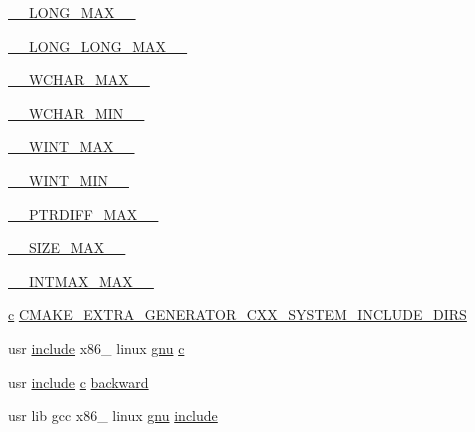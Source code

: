 \begin{DoxyCompactItemize}
\item 
\hyperlink{CMakeCache_8txt_a9efbe01f7e7b66cbdac106fb51e2f65f}{\+\_\+\+\_\+\+L\+O\+N\+G\+\_\+\+M\+A\+X\+\_\+\+\_\+}
\item 
\hyperlink{CMakeCache_8txt_ade7a297151900f13d47b71e6a9dda0a1}{\+\_\+\+\_\+\+L\+O\+N\+G\+\_\+\+L\+O\+N\+G\+\_\+\+M\+A\+X\+\_\+\+\_\+}
\item 
\hyperlink{CMakeCache_8txt_ab06c84ef26aaf126084f60730505b6b4}{\+\_\+\+\_\+\+W\+C\+H\+A\+R\+\_\+\+M\+A\+X\+\_\+\+\_\+}
\item 
\hyperlink{CMakeCache_8txt_ab2394184364567c4286a32eec574295e}{\+\_\+\+\_\+\+W\+C\+H\+A\+R\+\_\+\+M\+I\+N\+\_\+\+\_\+}
\item 
\hyperlink{CMakeCache_8txt_ade9fb9056c1b3e7f9417478f12ac5452}{\+\_\+\+\_\+\+W\+I\+N\+T\+\_\+\+M\+A\+X\+\_\+\+\_\+}
\item 
\hyperlink{CMakeCache_8txt_a0101eb15159977cbfe763d0d71a7023f}{\+\_\+\+\_\+\+W\+I\+N\+T\+\_\+\+M\+I\+N\+\_\+\+\_\+}
\item 
\hyperlink{CMakeCache_8txt_a047880d1824d5ce75ac17952c273fcc5}{\+\_\+\+\_\+\+P\+T\+R\+D\+I\+F\+F\+\_\+\+M\+A\+X\+\_\+\+\_\+}
\item 
\hyperlink{CMakeCache_8txt_ad4abf877d7a79e3d1d13494ce6d64d73}{\+\_\+\+\_\+\+S\+I\+Z\+E\+\_\+\+M\+A\+X\+\_\+\+\_\+}
\item 
\hyperlink{CMakeCache_8txt_a6b068320140ebfbbeaa001c18465ea9e}{\+\_\+\+\_\+\+I\+N\+T\+M\+A\+X\+\_\+\+M\+A\+X\+\_\+\+\_\+}
\item 
\hyperlink{CMakeCache_8txt_aac1d6a1710812201527c735f7c6afbaa}{c} \hyperlink{CMakeCache_8txt_ae84758144b16fbed96a3e6ea5781d3ad}{C\+M\+A\+K\+E\+\_\+\+E\+X\+T\+R\+A\+\_\+\+G\+E\+N\+E\+R\+A\+T\+O\+R\+\_\+\+C\+X\+X\+\_\+\+S\+Y\+S\+T\+E\+M\+\_\+\+I\+N\+C\+L\+U\+D\+E\+\_\+\+D\+I\+RS}
\item 
usr \hyperlink{CMakeCache_8txt_a986ccfc90e04633694fe6cff5472be19}{include} x86\+\_ linux \hyperlink{CMakeCache_8txt_acb61b5fec09bcc7d3b88bf1109612ea6}{gnu} \hyperlink{CMakeCache_8txt_aac1d6a1710812201527c735f7c6afbaa}{c}
\item 
usr \hyperlink{CMakeCache_8txt_a986ccfc90e04633694fe6cff5472be19}{include} \hyperlink{CMakeCache_8txt_aac1d6a1710812201527c735f7c6afbaa}{c} \hyperlink{CMakeCache_8txt_a4e00b9c657cdeb7b14ea0c43097dcecc}{backward}
\item 
usr lib gcc x86\+\_ linux \hyperlink{CMakeCache_8txt_acb61b5fec09bcc7d3b88bf1109612ea6}{gnu} \hyperlink{CMakeCache_8txt_a986ccfc90e04633694fe6cff5472be19}{include}
\item 

\end{DoxyCompactItemize}
